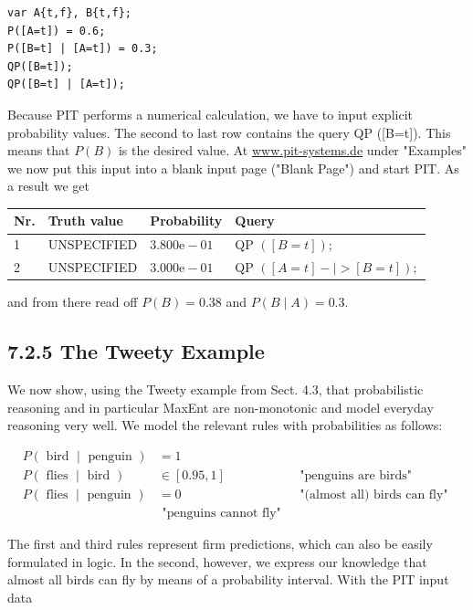 \documentclass[10pt]{article}
\begin{document}
\begin{verbatim}
var A{t,f}, B{t,f};
P([A=t]) = 0.6;
P([B=t] | [A=t]) = 0.3;
QP([B=t]);
QP([B=t] | [A=t]);
\end{verbatim}

Because PIT performs a numerical calculation, we have to input explicit probability values. The second to last row contains the query QP ([B=t]). This means that $P(B)$ is the desired value. At \href{http://www.pit-systems.de}{www.pit-systems.de} under "Examples" we now put this input into a blank input page ("Blank Page") and start PIT. As a result we get

\begin{center}
\begin{tabular}{llll}
\hline
Nr. & Truth value & Probability & Query \\
\hline
1 & UNSPECIFIED & $3.800 \mathrm{e}-01$ & QP $([B=t]) ;$ \\
\hline
2 & UNSPECIFIED & $3.000 \mathrm{e}-01$ & QP $([A=t]-\mid>[B=t]) ;$ \\
\hline
\end{tabular}
\end{center}

and from there read off $P(B)=0.38$ and $P(B \mid A)=0.3$.

\subsection*{7.2.5 The Tweety Example}
We now show, using the Tweety example from Sect. 4.3, that probabilistic reasoning and in particular MaxEnt are non-monotonic and model everyday reasoning very well. We model the relevant rules with probabilities as follows:

$$
\begin{array}{lll}
P(\text { bird } \mid \text { penguin }) & =1 & \\
P(\text { flies } \mid \text { bird }) & \in[0.95,1] & \text { "penguins are birds" } \\
P(\text { flies } \mid \text { penguin }) & =0 & \text { "(almost all) birds can fly" } \\
& \text { "penguins cannot fly" }
\end{array}
$$

The first and third rules represent firm predictions, which can also be easily formulated in logic. In the second, however, we express our knowledge that almost all birds can fly by means of a probability interval. With the PIT input data
\end{document}
